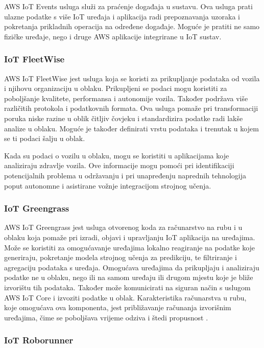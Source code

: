 AWS IoT Events usluga služi za praćenje događaja u sustavu. Ova usluga prati ulazne podatke s više IoT uređaja i aplikacija radi prepoznavanja uzoraka i pokretanja prikladnih operacija na određene događaje. Moguće je pratiti ne samo fizičke uređaje, nego i druge AWS aplikacije integrirane u IoT sustav.

\subsubsection{IoT FleetWise}

AWS IoT FleetWise jest usluga koja se koristi za prikupljanje podataka od vozila i njihovu organizaciju u oblaku. Prikupljeni se podaci mogu koristiti za poboljšanje kvalitete, performansa i autonomije vozila. Također podržava više različitih protokola i podatkovnih formata. Ova usluga pomaže pri transformaciji poruka niske razine  u oblik čitljiv čovjeku i standardizira podatke radi lakše analize u oblaku. Moguće je također definirati vrstu podataka i trenutak u kojem se ti podaci šalju u oblak.

Kada su podaci o vozilu u oblaku, mogu se koristiti u aplikacijama koje analiziraju zdravlje vozila. Ove informacije mogu pomoći pri identifikaciji potencijalnih problema u održavanju i pri unapređenju naprednih tehnologija poput autonomne i asistirane vožnje integracijom strojnog učenja.

\subsubsection{IoT Greengrass}

AWS IoT Greengrass jest usluga otvorenog koda  za računarstvo na rubu  i u oblaku koja pomaže pri izradi, objavi i upravljanju IoT aplikacija na uređajima. Može se koristiti za omogućavanje uređajima lokalno reagiranje na podatke koje generiraju, pokretanje modela strojnog učenja za predikciju, te filtriranje i agregaciju podataka s uređaja. Omogućava uređajima da prikupljaju i analiziraju podatke ne u oblaku, nego ili na samom uređaju ili drugom mjestu koje je bliže izvorištu tih podataka. Također može komunicirati na siguran način s uslugom AWS IoT Core i izvoziti podatke u oblak. Karakteristika računarstva u rubu, koje omogućava ova komponenta, jest približavanje računanja izvorišnim uređajima, čime se poboljšava vrijeme odziva i štedi propusnost \cite{what_is_edge}.

\subsubsection{IoT Roborunner}


